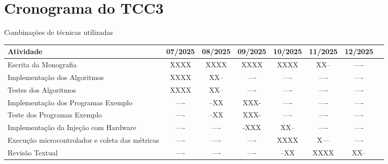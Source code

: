 \section{Cronograma do TCC3}

\begin{quadro}[H]
    \centering
    \caption{Combinações de técnicas utilizadas}
    \begin{tabular}{|p{}|c|c|c|c|c|c|c|}
    \hline
    \rowcolor[HTML]{C0C0C0}
    \hline
    \textbf{Atividade} & \textbf{07/2025} & \textbf{08/2025} & \textbf{09/2025} & \textbf{10/2025} & \textbf{11/2025} & \textbf{12/2025} \\
    \hline
    Escrita da Monografia                           & XXXX & XXXX & XXXX & XXXX  & XX-- & ---- \\
    \hline
    Implementação dos Algoritmos                    & XXXX & XX-- & ---- & ----  & ---- & ---- \\
    \hline
    Testes dos Algoritmos                           & XXXX & XX-- & ---- & ----  & ---- & ---- \\
    \hline
    Implementação dos Programas Exemplo             & ---- & --XX & XXX- & ----  & ---- & ---- \\
    \hline
    Teste dos Programas Exemplo                     & ---- & --XX & XXX- & ----  & ---- & ---- \\
    \hline
    Implementação da Injeção com Hardware           & ---- & ---- & -XXX & XX--  & ---- & ---- \\
    \hline
    Execução microcontrolador e coleta das métricas & ---- & ---- & ---- & XXXX  & X--- & ---- \\
    \hline
    Revisão Textual                                 & ---- & ---- & ---- & --XX  & XXXX & XX-- \\
    \hline
    \end{tabular}
    \label{tab:riscos}
\end{quadro}




